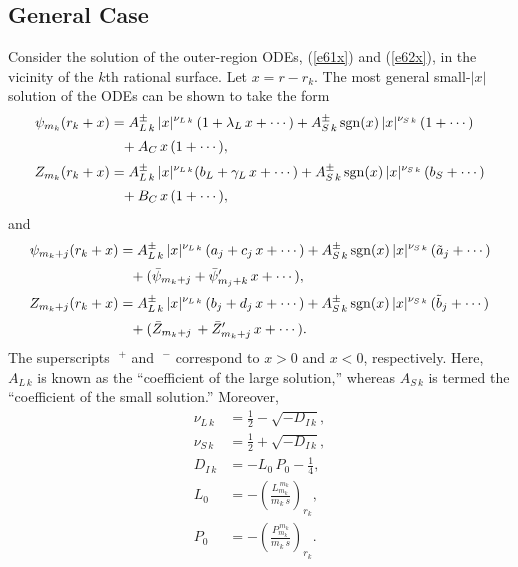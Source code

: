 \documentclass[12pt,prb,aps]{revtex4-1}
\begin{document}
\subsection{General Case}\label{sgen}
Consider the solution of the outer-region ODEs, (\ref{e61x}) and (\ref{e62x}), in the
vicinity of the $k$th rational surface. Let  $x=r-r_k$.  The most general small-$|x|$ solution of the ODEs
can be shown to take the form\,\cite{am1,am3}
\begin{align}
\psi_{m_k}(r_k+x)&=A_{L\,k}^\pm \,|x|^{\nu_{L\,k}}\,(1+\lambda_{L}\,x+\cdots) + A_{S\,k}^{\pm}\,{\rm sgn}(x)\,|x|^{\nu_{S\,k}}\,(1+\cdots) \nonumber\\[0.5ex]
& \phantom{=}+ A_{C}\,x\,(1+\cdots),\label{ex1}\\[0.5ex]
Z_{m_k}(r_k+x)&= A_{L\,k}^\pm\,|x|^{\nu_{L\,k}}(b_{L}  + \gamma_{L}\,x+\cdots) + A_{S\,k}^{\pm}\,{\rm sgn}(x)\,|x|^{\nu_{S\,k}}\,(b_{S}+\cdots)\nonumber\\[0.5ex]
& \phantom{=}+ B_{C}\,x\,(1+\cdots),\label{ex2}
\end{align}
and 
\begin{align}
\psi_{m_k+j}(r_k+x)&=A_{L\,k}^\pm\,|x|^{\nu_{L\,k}}\,(a_j+c_j\,x+\cdots)  
+A_{S\,k}^\pm\,{\rm sgn}(x)\,|x|^{\nu_{S\,k}}\,(\tilde{a}_{j}+\cdots)\nonumber\\[0.5ex]
&\phantom{=}+ (\bar{\psi}_{m_k+j}+\bar{\psi}_{m_j+k}'\,x+\cdots),\\[0.5ex]
Z_{m_k+j}(r_k+x)&= A_{L\,k}^\pm\,|x|^{\nu_{L\,k}}\,(b_j+d_j\,x+\cdots) +A_{S\,k}^\pm\,{\rm sgn}(x)\,|x|^{\nu_{S\,k}}\,(\tilde{b}_{j}+\cdots)\nonumber\\[0.5ex]
&\phantom{=}+(\bar{Z}_{m_k+j}\,+\bar{Z}_{m_k+j}'\,x+\cdots).\label{ex4}
\end{align}
The superscripts $\phantom{!}^+$ and $\phantom{!}^-$ correspond  to $x>0$ and $x<0$, respectively. Here, $A_{L\,k}$ is known as the ``coefficient of
the large solution,'' whereas $A_{S\,k}$ is termed the ``coefficient of the small solution.''\cite{am1,am3,ggj}
Moreover, 
\begin{align}
\nu_{L\,k}&= \frac{1}{2}-\sqrt{-D_{I\,k}},\label{nul}\\[0.5ex]
\nu_{S\,k} &=  \frac{1}{2}+\sqrt{-D_{I\,k}},\label{nus}\\[0.5ex]
D_{I\,k} &= -L_0\,P_0-\frac{1}{4},\\[0.5ex]
L_0 &=-\left(\frac{L_{m_k}^{\,m_k}}{m_k\,s}\right)_{r_k},\label{lkk}\\[0.5ex]
P_0 &= -\left(\frac{P_{m_k}^{\,m_k}}{m_k\,s}\right)_{r_k}.\label{pkk}
\end{align}
\end{document}
